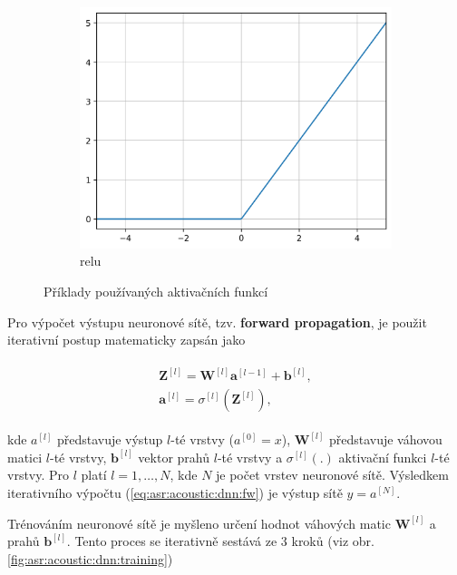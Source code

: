 \begin{figure}[htpb]
\begin{subfigure}[b]{0.28\textwidth}
    \includegraphics[width=\textwidth]{./ch4-asr/img/relu.png}
    \caption{relu}
    \label{fig:asr:acoustic:dnn:activation:relu}
  \end{subfigure}
  \caption{Příklady používaných aktivačních funkcí}
  \label{fig:asr:acoustic:dnn:activation}
\end{figure}

Pro výpočet výstupu neuronové sítě, tzv. \textbf{forward propagation}, je použit iterativní postup matematicky zapsán jako

\begin{align}
  \begin{split}
    \mathbf{Z}^{[l]} = \mathbf{W}^{[l]}\mathbf{a}^{[l-1]} + \mathbf{b}^{[l]}, \\
    \mathbf{a}^{[l]} = \sigma^{[l]}\left(\mathbf{Z}^{[l]}\right),
  \end{split}
  \label{eq:asr:acoustic:dnn:fw}
\end{align}

\noindent kde $a^{[l]}$ představuje výstup $l$-té vrstvy ($a^{[0]} = x$), $\mathbf{W}^{[l]}$ představuje váhovou matici $l$-té vrstvy, $\mathbf{b}^{[l]}$ vektor prahů $l$-té vrstvy a $\sigma^{[l]}(.)$ aktivační funkci $l$-té vrstvy. Pro $l$ platí $l = 1, \dots, N$, kde $N$ je počet vrstev neuronové sítě. Výsledkem iterativního výpočtu (\ref{eq:asr:acoustic:dnn:fw}) je výstup sítě $y = a^{[N]}$.

Trénováním neuronové sítě je myšleno určení hodnot váhových matic $\mathbf{W}^{[l]}$ a prahů $\mathbf{b}^{[l]}$. Tento proces se iterativně sestává ze 3 kroků (viz obr. \ref{fig:asr:acoustic:dnn:training})

